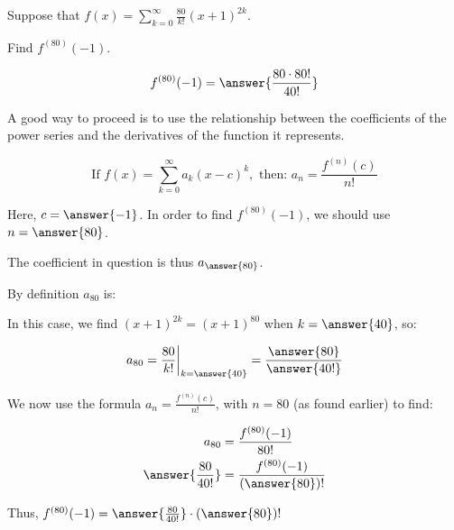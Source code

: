 \documentclass{ximera}
\author{Jim Talamo}
\begin{document}
\begin{exercise}
Suppose that $f(x) = \sum_{k=0}^{\infty} \frac{80}{k!}(x+1)^{2k}$.

\begin{exercise}
Find $f^{(80)}(-1)$.

\[
f^{(80)}(-1) = \answer{\frac{80 \cdot 80!}{40!}}
\]
\end{exercise}

\begin{hint}
A good way to proceed is to use the relationship between the coefficients of the power series and the derivatives of the function it represents.

\[
\textrm{If } f(x) = \sum_{k=0}^{\infty} a_k(x-c)^k, \textrm{ then: } a_n = \frac{f^{(n)}(c)}{n!}
\]

Here, $c=\answer{-1}$.  In order to find $f^{(80)}(-1)$, we should use $n=\answer{80}$.

The coefficient in question is thus $a_{\answer{80}}$.  

\begin{question}
By definition $a_{80}$ is:

\begin{multipleChoice}
\end{multipleChoice}

In this case, we find $(x+1)^{2k}=(x+1)^{80}$ when $k=\answer{40}$, so:

\[
a_{80} =  \frac{80}{k!} \bigg|_{k=\answer{40}} = \frac{\answer{80}}{\answer{40!}}
\]

\begin{question}
We now use the formula $a_n = \frac{f^{(n)}(c)}{n!}$, with $n=80$ (as found earlier) to find:

\begin{align*}
a_{80} &= \frac{f^{(80)}(-1)}{80!} \\
\answer{\frac{80}{40!}} &= \frac{f^{(80)}(-1)}{\left(\answer{80}\right)!}
\end{align*}

\begin{question}
Thus, $f^{(80)}(-1) = \answer{\frac{80}{40!}} \cdot \left(\answer{80}\right)! $

\end{question}
\end{question}
\end{question}

\end{hint}

\end{exercise}
\end{document}
